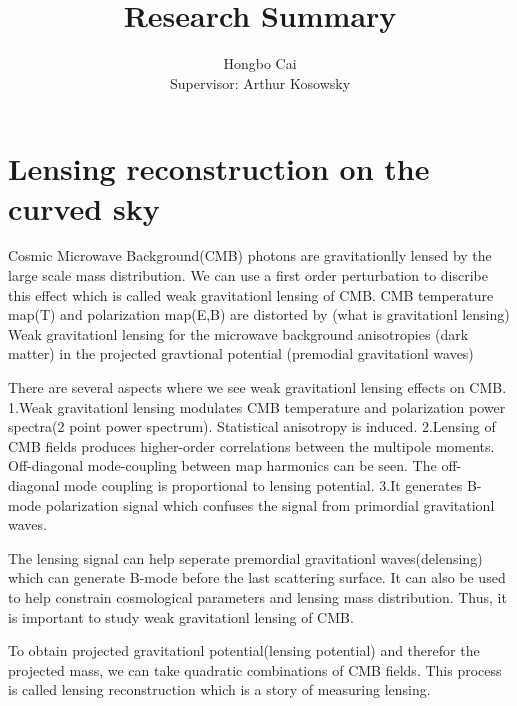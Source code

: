\documentclass[12pt, notitlepage, onecolumn, amsmath, amssymb, aps]{revtex4-1}
\title{}
\begin{document}
\title{Research Summary}
\author{Hongbo Cai \\{\small Supervisor: Arthur Kosowsky}}
\maketitle
\newcommand{\edit}[1]{\textcolor{red}{(#1)}}
\vspace{-1.5cm}
\section{Lensing reconstruction on the curved sky}
\label{sec:org8852578}


Cosmic Microwave Background(CMB) photons are gravitationlly lensed by the large scale mass distribution. We can use a first order perturbation to discribe this effect which is called weak gravitationl lensing of CMB.
CMB temperature map(T) and polarization map(E,B) are distorted by 
(what is gravitationl lensing)
Weak gravitationl lensing for the microwave background anisotropies
(dark matter)
in the projected gravtional potential
(premodial gravitationl waves)




There are several aspects where we see weak gravitationl lensing effects on CMB.
1.Weak gravitationl lensing modulates CMB temperature and polarization power spectra(2 point power spectrum). Statistical anisotropy is induced.
2.Lensing of CMB fields produces higher-order correlations between the multipole moments. Off-diagonal mode-coupling between map harmonics can be seen. The off-diagonal mode coupling is proportional to lensing potential.\cite{Hu:2001kj}
3.It generates B-mode polarization signal which confuses the signal from primordial gravitationl waves.\cite{Lewis:2006fu}

The lensing signal can help seperate premordial gravitationl waves(delensing) which can generate B-mode before the last scattering surface. It can also be used to help constrain cosmological parameters and lensing mass distribution. Thus, it is important to study weak gravitationl lensing of CMB.

To obtain projected gravitationl potential(lensing potential) and therefor the projected mass, we can take quadratic combinations of CMB fields. This process is called lensing reconstruction which is a story of measuring lensing. 
\end{document}
